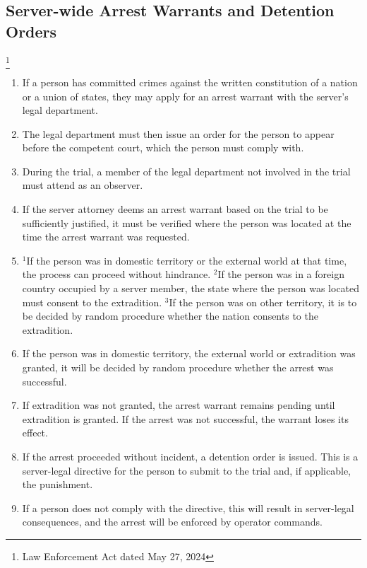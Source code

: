 \documentclass{article}
\begin{document}
\subsection{Server-wide Arrest Warrants and Detention Orders}\footnote{Law Enforcement Act dated May 27, 2024}
\begin{enumerate}[(1)]
    \item If a person has committed crimes against the written constitution of a nation or a union of states, they may apply for an arrest warrant with the server's legal department.
    \item The legal department must then issue an order for the person to appear before the competent court, which the person must comply with.
    \item During the trial, a member of the legal department not involved in the trial must attend as an observer.
    \item If the server attorney deems an arrest warrant based on the trial to be sufficiently justified, it must be verified where the person was located at the time the arrest warrant was requested.
	\item $^{1}$If the person was in domestic territory or the external world at that time, the process can proceed without hindrance. $^{2}$If the person was in a foreign country occupied by a server member, the state where the person was located must consent to the extradition. $^{3}$If the person was on other territory, it is to be decided by random procedure whether the nation consents to the extradition.
	\item If the person was in domestic territory, the external world or extradition was granted, it will be decided by random procedure whether the arrest was successful.
	\item If extradition was not granted, the arrest warrant remains pending until extradition is granted. If the arrest was not successful, the warrant loses its effect.
	\item If the arrest proceeded without incident, a detention order is issued. This is a server-legal directive for the person to submit to the trial and, if applicable, the punishment.
	\item If a person does not comply with the directive, this will result in server-legal consequences, and the arrest will be enforced by operator commands.
\end{enumerate}
\end{document}
